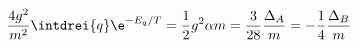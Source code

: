 \begin{equation*}
  \frac{4g^2}{m^2}\intdrei{q} \e^{-E_q/T}=\frac12g^2 \alpha m=
\frac{3}{28}\frac{\Delta_A}{m}=-\frac{1}{4}\frac{\Delta_B}{m}
\end{equation*}

